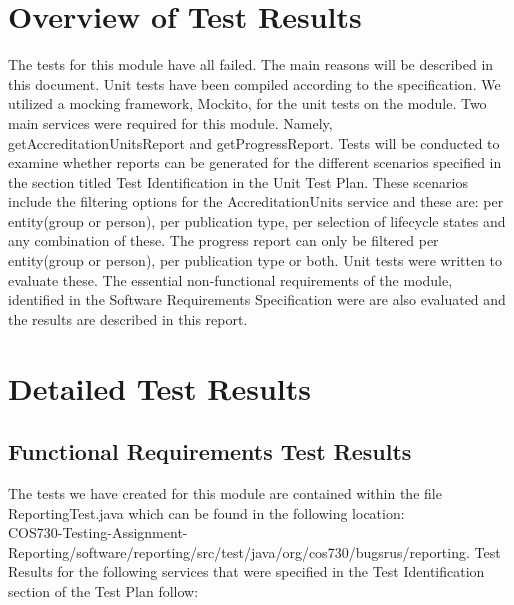 
\section{Overview of Test Results}
\label{sec:overviewResults}
The tests for this module have all failed. The main reasons will be described in this document. Unit tests have been compiled according to the specification. We utilized a mocking framework, Mockito, for the unit tests on the module. Two main services were required for this module. Namely, getAccreditationUnitsReport and  getProgressReport. Tests will be conducted to examine whether reports can be generated for the different scenarios specified in the section titled Test Identification in the Unit Test Plan. These scenarios include the filtering options for the AccreditationUnits service and these are: per entity(group or person), per publication type, per selection of lifecycle states and any combination of these. The progress report can only be filtered per entity(group or person), per publication type or both. Unit tests were written to evaluate these. The essential non-functional requirements of the module, identified in the Software Requirements Specification were are also evaluated and the results are described in this report. 
\section{Detailed Test Results} 
\label{sec:detailedResults}  
\subsection{Functional Requirements Test Results}
The tests we have created for this module are contained within the file ReportingTest.java which can be found in the following location:
\\  COS730-Testing-Assignment-Reporting/software/reporting/src/test/java/org/cos730/bugsrus/reporting.
Test Results for the following services that were specified in the Test Identification section of the Test Plan follow:  
